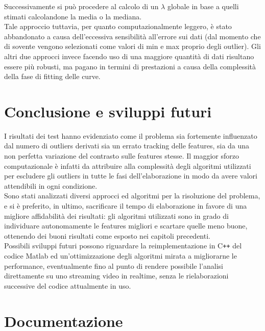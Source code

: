 \documentclass[12pt]{report}
\begin{document}
\noindent Successivamente si pu\`o procedere al calcolo di un $\lambda$ globale in base a quelli stimati calcolandone la media o la mediana.\\

\noindent Tale approccio tuttavia, per quanto computazionalmente leggero, \`e stato abbandonato a causa dell'eccessiva sensibilit\`a all'errore sui dati (dal momento che di sovente vengono selezionati come valori di min e max proprio degli outlier). Gli altri due approcci invece facendo uso di una maggiore quantit\`a di dati risultano essere pi\`u robusti, ma pagano in termini di prestazioni a causa della complessit\`a della fase di fitting delle curve.




\chapter{Conclusione e sviluppi futuri}

\noindent I risultati dei test hanno evidenziato come il problema sia fortemente influenzato dal numero di outliers derivati sia un errato tracking delle features, sia da una non perfetta variazione del contrasto sulle features stesse. Il maggior sforzo computazionale \`e infatti da attribuire alla complessit\`a degli algoritmi utilizzati per escludere gli outliers in tutte le fasi dell'elaborazione in modo da avere valori attendibili in ogni condizione.\\

\noindent Sono stati analizzati diversi approcci ed algoritmi per la risoluzione del problema, e si \`e preferito, in ultimo, sacrificare il tempo di elaborazione in favore di una migliore affidabilit\`a dei risultati: gli algoritmi utilizzati sono in grado di individuare autonomamente le features migliori e scartare quelle meno buone, ottenendo dei buoni risultati come esposto nei capitoli precedenti.\\

\noindent Possibili sviluppi futuri possono riguardare la reimplementazione in C\verb|++| del codice Matlab ed un'ottimizzazione degli algoritmi mirata a migliorarne le performance, eventualmente fino al punto di rendere possibile l'analisi direttamente su uno streaming video in realtime, senza le rielaborazioni successive del codice attualmente in uso.





\chapter{Documentazione}
\end{document}
